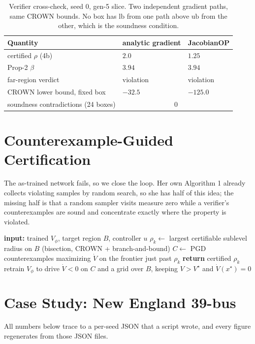 \documentclass[letterpaper,journal]{IEEEtran}
\newcommand{\Lie}{\dot{V}}
\newcommand{\xstar}{x^\star}
\newcommand{\Vstar}{V^\star}
\begin{document}
\begin{table}[t]
\caption{Verifier cross-check, seed 0, gen-5 slice. Two independent gradient paths,
same CROWN bounds. No box has $\mathrm{lb}$ from one path above $\mathrm{ub}$ from
the other, which is the soundness condition.}
\label{tab:crosscheck}
\centering
\begin{tabular}{@{}lll@{}}
\toprule
Quantity & analytic gradient & JacobianOP \\
\midrule
certified $\rho$ (4b)        & $2.0$   & $1.25$ \\
Prop-2 $\beta$               & $3.94$  & $3.94$ \\
far-region verdict          & violation & violation \\
CROWN lower bound, fixed box & $-32.5$ & $-125.0$ \\
soundness contradictions (24 boxes) & \multicolumn{2}{c}{$0$} \\
\bottomrule
\end{tabular}
\end{table}

\section{Counterexample-Guided Certification}
The as-trained network fails, so we close the loop. Her own Algorithm 1 already
collects violating samples by random search, so she has half of this idea; the
missing half is that a random sampler visits measure zero while a verifier's
counterexamples are sound and concentrate exactly where the property is violated.

\begin{algorithm}[t]
\caption{Counterexample-guided certification (CEGIS)}
\label{alg:cegis}
\begin{algorithmic}[1]
\STATE \textbf{input:} trained $V_\phi$, target region $B$, controller $u$
  \STATE $\rho_k \leftarrow$ largest certifiable sublevel radius on $B$ (bisection, CROWN + branch-and-bound)
  \STATE $C \leftarrow$ PGD counterexamples maximizing $\Lie$ on the frontier just past $\rho_k$
   \STATE \textbf{return} certified $\rho_k$ \ENDIF
  \STATE retrain $V_\phi$ to drive $\Lie<0$ on $C$ and a grid over $B$, keeping $V>\Vstar$ and $\Lie(\xstar)=0$
\ENDFOR
\end{algorithmic}
\end{algorithm}

\section{Case Study: New England 39-bus}
All numbers below trace to a per-seed JSON that a script wrote, and every figure
regenerates from those JSON files.
\end{document}
